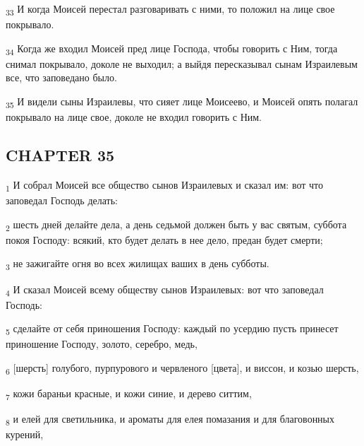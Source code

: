 \begin{tcolorbox}
\textsubscript{33} И когда Моисей перестал разговаривать с ними, то положил на лице свое покрывало.
\end{tcolorbox}
\begin{tcolorbox}
\textsubscript{34} Когда же входил Моисей пред лице Господа, чтобы говорить с Ним, тогда снимал покрывало, доколе не выходил; а выйдя пересказывал сынам Израилевым все, что заповедано было.
\end{tcolorbox}
\begin{tcolorbox}
\textsubscript{35} И видели сыны Израилевы, что сияет лице Моисеево, и Моисей опять полагал покрывало на лице свое, доколе не входил говорить с Ним.
\end{tcolorbox}
\subsection{CHAPTER 35}
\begin{tcolorbox}
\textsubscript{1} И собрал Моисей все общество сынов Израилевых и сказал им: вот что заповедал Господь делать:
\end{tcolorbox}
\begin{tcolorbox}
\textsubscript{2} шесть дней делайте дела, а день седьмой должен быть у вас святым, суббота покоя Господу: всякий, кто будет делать в нее дело, предан будет смерти;
\end{tcolorbox}
\begin{tcolorbox}
\textsubscript{3} не зажигайте огня во всех жилищах ваших в день субботы.
\end{tcolorbox}
\begin{tcolorbox}
\textsubscript{4} И сказал Моисей всему обществу сынов Израилевых: вот что заповедал Господь:
\end{tcolorbox}
\begin{tcolorbox}
\textsubscript{5} сделайте от себя приношения Господу: каждый по усердию пусть принесет приношение Господу, золото, серебро, медь,
\end{tcolorbox}
\begin{tcolorbox}
\textsubscript{6} [шерсть] голубого, пурпурового и червленого [цвета], и виссон, и козью шерсть,
\end{tcolorbox}
\begin{tcolorbox}
\textsubscript{7} кожи бараньи красные, и кожи синие, и дерево ситтим,
\end{tcolorbox}
\begin{tcolorbox}
\textsubscript{8} и елей для светильника, и ароматы для елея помазания и для благовонных курений,
\end{tcolorbox}

